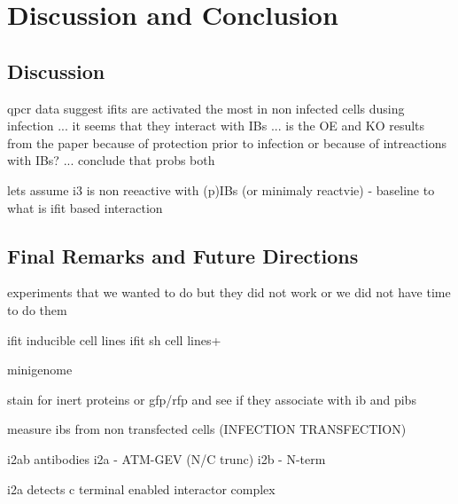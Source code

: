 \chapter{Discussion and Conclusion}
\section{Discussion}

qpcr data suggest ifits are activated the most in non infected cells dusing infection ... it seems that they interact with IBs ... is the OE and KO results from the paper because of protection prior to infection or because of intreactions with IBs? ... conclude that probs both


lets assume i3 is non reeactive with (p)IBs (or minimaly reactvie) - baseline to what is ifit based interaction

\section{Final Remarks and Future Directions}
experiments that we wanted to do but they did not work or we did not have time to do them

ifit inducible cell lines
ifit sh cell lines+

minigenome

stain for inert proteins or gfp/rfp and see if they associate with ib and pibs

measure ibs from non transfected cells (INFECTION TRANSFECTION)

i2ab antibodies
i2a - ATM-GEV (N/C trunc)
i2b - N-term

i2a detects c terminal enabled interactor complex

